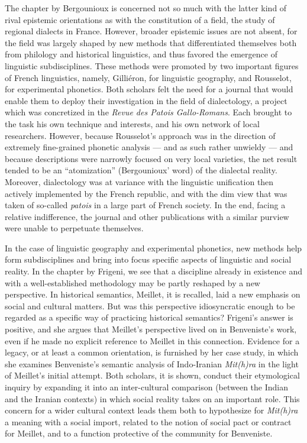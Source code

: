 \documentclass[output=paper]{langsci/langscibook}
\begin{document}
The chapter by Bergounioux is concerned not so much with the latter kind of rival epistemic orientations as with the constitution of a field, the study of regional dialects in France. However, broader epistemic issues are not absent, for the field was largely shaped by new methods that differentiated themselves both from philology and historical linguistics, and thus favored the emergence of linguistic subdisciplines. These methods were promoted by two important figures of French linguistics, namely, Gilliéron, for linguistic geography, and Rousselot, for experimental phonetics. Both scholars felt the need for a journal that would enable them to deploy their investigation in the field of dialectology, a project which was concretized in the \emph{Revue des Patois Gallo-Romans}. Each brought to the task his own technique and interests, and his own network of local researchers. However, because Rousselot's approach was in the direction of extremely fine-grained phonetic analysis — and as such rather unwieldy — and because descriptions were narrowly focused on very local varieties, the net result tended to be an ``atomization'' (Bergounioux' word) of the dialectal reality. Moreover, dialectology was at variance with the linguistic unification then actively implemented by the French republic, and with the dim view that was taken of so-called \emph{patois} in a large part of French society. In the end, facing a relative indifference, the journal and other publications with a similar purview were unable to perpetuate themselves.

In the case of linguistic geography and experimental phonetics, new methods help form subdisciplines and bring into focus specific aspects of linguistic and social reality. In the chapter by Frigeni, we see that a discipline already in existence and with a well-established methodology may be partly reshaped by a new perspective. In historical semantics, Meillet, it is recalled, laid a new emphasis on social and cultural matters. But was this perspective idiosyncratic enough to be regarded as a specific way of practicing historical semantics? Frigeni's answer is positive, and she argues that Meillet's perspective lived on in Benveniste's work, even if he made no explicit reference to Meillet in this connection. Evidence for a legacy, or at least a common orientation, is furnished by her case study, in which she examines Benveniste's semantic analysis of Indo-Iranian \emph{Mit(h)ra} in the light of Meillet's initial attempt. Both scholars, it is shown, conduct their etymological inquiry by expanding it into an inter-cultural comparison (between the Indian and the Iranian contexts) in which social reality takes on an important role. This concern for a wider cultural context leads them both to hypothesize for \emph{Mit(h)ra} a meaning with a social import, related to the notion of social pact or contract for Meillet, and to a function protective of the community for Benveniste.
\end{document}
